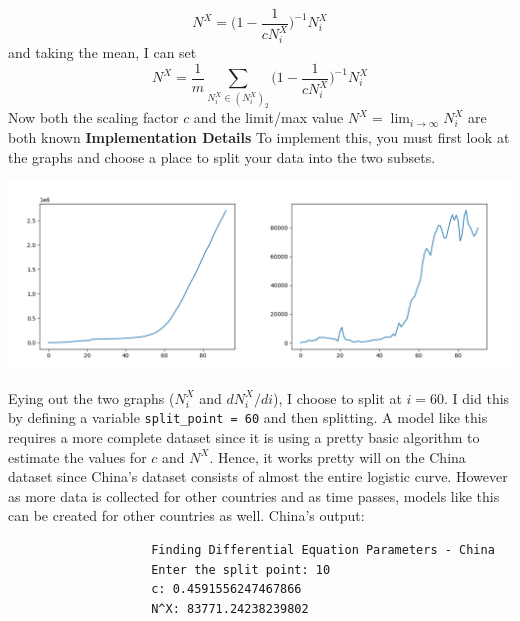 \documentclass{report}
\begin{document}
                $$N^X = \big(1 - \dfrac{1}{cN^X_i}\big)^{-1}N^X_i$$
                and taking the mean, I can set
                \begin{equation}
                    N^X = \dfrac{1}{m}\sum_{N^X_i \in (N^X_i)_2}\big(1 - \dfrac{1}{cN^X_i}\big)^{-1}N^X_i
                \end{equation}
                Now both the scaling factor $c$ and the limit/max value $N^X = \lim_{i \rightarrow \infty} N^X_i$ are both known
                \newline
                \textbf{Implementation Details}
                \newline
                To implement this, you must first look at the graphs and choose a place to split your data into the two subsets.
                \begin{center}
                    \includegraphics[width=\textwidth]{plots/global/de_parameters/combined.png}
                \end{center}
                Eying out the two graphs ($N^X_i$ and $dN^X_i/di$), I choose to split at $i = 60$. I did this by defining a variable \lstinline{split_point = 60} and then splitting.
                \newline\indent
                A model like this requires a more complete dataset since it is using a pretty basic algorithm to estimate the values for $c$ and $N^X$. Hence, it works pretty will on the China dataset since China's dataset consists of almost the entire logistic curve. However as more data is collected for other countries and as time passes, models like this can be created for other countries as well.
                \newline\indent
                China's output:
                \begin{lstlisting}
                    Finding Differential Equation Parameters - China
                    Enter the split point: 10
                    c: 0.4591556247467866
                    N^X: 83771.24238239802
                \end{lstlisting}
\end{document}
